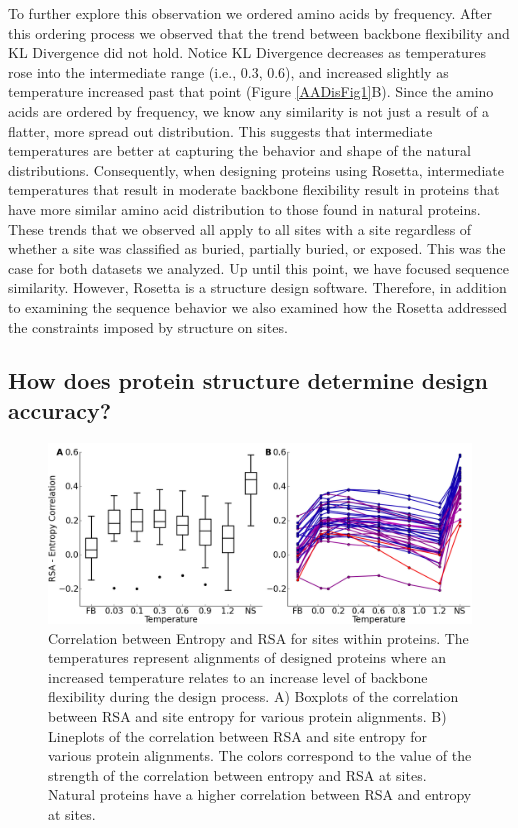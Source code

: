 \documentclass[12pt]{article}
\begin{document}
\par To further explore this observation we ordered amino acids by frequency. After this ordering process we observed that the trend between backbone flexibility and KL Divergence did not hold. Notice KL Divergence decreases as temperatures rose into the intermediate range (i.e., 0.3, 0.6), and increased slightly as temperature increased past that point (Figure \ref{AADisFig1}B). Since the amino acids are ordered by frequency, we know any similarity is not just a result of a flatter, more spread out distribution. This suggests that intermediate temperatures are better at capturing the behavior and shape of the natural distributions. Consequently, when designing proteins using Rosetta, intermediate temperatures that result in moderate backbone flexibility result in proteins that have more similar amino acid distribution to those found in natural proteins. These trends that we observed all apply to all sites with a site regardless of whether a site was classified as buried, partially buried, or exposed. This was the case for both datasets we analyzed.  Up until this point, we have focused sequence similarity. However, Rosetta is a structure design software. Therefore, in addition to examining the sequence behavior we also examined how the Rosetta addressed the constraints imposed by structure on sites. 

\subsection{How does protein structure determine design accuracy?}
\label{ProteinStructure}

\begin{figure}[H]
\centering
\centerline{\includegraphics[width = 6in]{figures/Cor_Mean_Entropy_RSA_Combination_Plot.png}}
\caption{Correlation between Entropy and RSA for sites within proteins.  The temperatures represent alignments of designed proteins where an increased temperature relates to an increase level of backbone flexibility during the design process. A) Boxplots of the correlation between RSA and site entropy for various protein alignments. B) Lineplots of the correlation between RSA and site entropy for various protein alignments. The colors correspond to the value of the strength of the correlation between entropy and RSA at sites. Natural proteins have a higher correlation between RSA and entropy at sites.}
\label{StructureFig1}
\end{figure}
\end{document}
